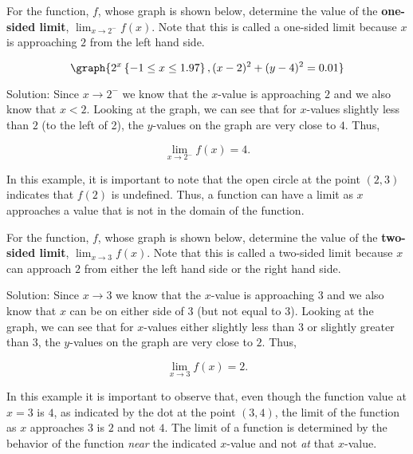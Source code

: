 \documentclass{ximera}
\begin{document}
\begin{example} %

For the function, $f$, whose graph is shown below, determine the value of the {\bf one-sided limit}, 
$\lim_{x\to 2^-} f(x)$. Note that this is called a one-sided limit because $x$ is approaching $2$ from the left hand side.


\[
\graph{2^x \left\{ -1 \leq x \leq 1.97 \right\}, (x-2)^2 + (y-4)^2 = 0.01}
\]





Solution: Since $x \to 2^-$ we know that the $x$-value is approaching $2$ and we also know that $x<2$. 
Looking at the graph, we can see that for $x$-values slightly less than $2$ (to the left of 2), 
the $y$-values on the graph are very close to $4$. Thus, 

$$\lim_{x\to 2^-} f(x) = 4.$$

In this example, it is important to note that the open circle at the point $(2,3)$ indicates that $f(2)$ is undefined.
Thus, a function can have a limit as $x$ approaches a value that is not in the domain of the function. 

\end{example}

\begin{example} %
For the function, $f$, whose graph is shown below, determine the value of the {\bf two-sided limit}, 
$\lim_{x\to 3} f(x)$.  Note that this is called a two-sided limit because $x$ can 
approach $2$ from either the left hand side or the right hand side.



Solution: Since $x \to 3$ we know that the $x$-value is approaching $3$ and we also know 
that $x$ can be on either side of $3$ (but not equal to 3). 
Looking at the graph, we can see that for $x$-values either slightly less than $3$ or slightly greater than $3$, 
the $y$-values on the graph are very close to $2$. Thus, 

\[
\lim_{x\to 3} f(x) = 2.
\]

In this example it is important to observe that, even though the function value at $x= 3$ is $4$, 
as indicated by the dot at the point $(3,4)$, the limit of the function as $x$ approaches $3$ is $2$ and not $4$.  
The limit of a function is determined by the behavior of the function {\it near} the 
indicated $x$-value and not {\it at} that $x$-value.\\

\end{example}
\end{document}
